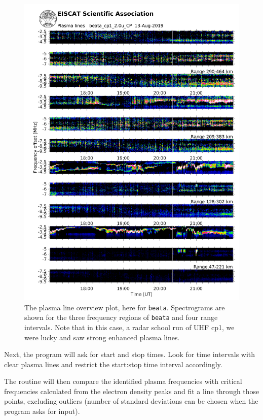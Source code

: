 \documentclass[a4]{article}
\begin{document}
\begin{figure}
  \begin{center}
    \includegraphics[width=\linewidth]{pl_spec}
  \end{center}
  \caption{\label{fig:pl-overview}The plasma line overview plot, here for \texttt{beata}. Spectrograms
    are shown for the three frequency regions of \texttt{beata} and four range
    intervals. Note that in this case, a radar school run of UHF cp1,
    we were lucky and saw strong enhanced plasma lines.}
\end{figure}

Next, the program will ask for start and stop times.  Look for time
intervals with clear plasma lines and restrict the start:stop time
interval accordingly.

The routine will then compare the identified plasma frequencies with
critical frequencies calculated from the electron density peaks and
fit a line through those points, excluding outliers (number of
standard deviations can be chosen when the program asks for
input).
\end{document}

